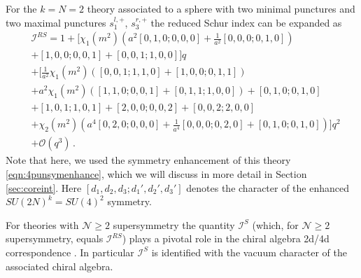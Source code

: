 \documentclass[main.tex]{subfiles}
\begin{document}
For the $k=N=2$ theory associated to a sphere with two minimal punctures and two maximal punctures $s_{1}^{l,+}$, $s_{3}^{r,+}$ the reduced Schur index can be expanded as
\begin{equation}
\begin{aligned}\label{eqn:IRSexpand}
&\mathcal{I}^{RS}=1+\Big[\chi_1(m^2)\left(a^2 [0,1,0;0,0,0]+\frac{1}{a^2}[0,0,0;0,1,0]\right)\\
&+[1,0,0;0,0,1]+[0,0,1;1,0,0] \Big]q\\
&+\Big[\frac{1}{a^2}\chi_1(m^2)\left([0,0,1;1,1,0]+[1,0,0;0,1,1]\right)\\
&+a^2\chi_1(m^2)\left([1,1,0;0,0,1] + [0,1,1;1,0,0]\right)+[0,1,0;0,1,0]\\
&+[1,0,1;1,0,1]+[2,0,0;0,0,2]+[0,0,2;2,0,0]\\
&+ \chi_2(m^2)\left(a^4[0,2,0;0,0,0]+\frac{1 }{a^4}[0,0,0;0,2,0]+[0,1,0;0,1,0]\right)\Big]q^2\\
&+\mathcal{O}(q^3)\,.
\end{aligned}
\end{equation} 
Note that here, we used the symmetry enhancement of this theory \eqref{eqn:4punsymenhance}, which we will discuss in more detail in Section \ref{sec:coreint}. Here $[d_1,d_2,d_3;d_1',d_2',d_3']$ denotes the character of the enhanced $SU(2N)^k=SU(4)^2$ symmetry.

For theories with $\mathcal{N}\geq2$ supersymmetry the quantity $\mathcal{I}^S$ (which, for $\mathcal{N}\geq2$ supersymmetry, equals $\mathcal{I}^{RS}$) plays a pivotal role in the chiral algebra 2d/4d correspondence \cite{Beem:2013sza}. In particular $\mathcal{I}^S$ is identified with the vacuum character of the associated chiral algebra. 
\end{document}
